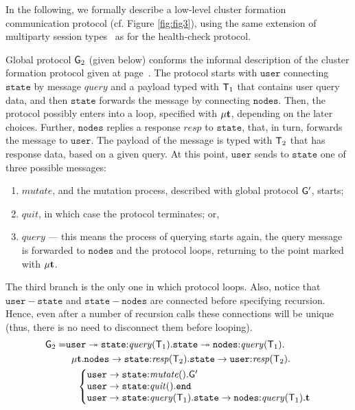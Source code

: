 In the following, we formally describe a low-level cluster formation communication protocol (cf. Figure \ref{fig:fig3}), using the same extension of multiparty session types~\cite{HuY17} as for the health-check protocol.

Global protocol ${\sf G}_2$ (given below) conforms the informal description of the cluster formation protocol given at page~\pageref{cluster_formation_informal_description}. 
The protocol starts with $\mathtt{user}$ connecting $\mathtt{state}$ by message $\mathit{query}$ and a payload typed with ${\mathsf T}_1$ that contains user query data, and  then $\mathtt{state}$ forwards the message by connecting $\mathtt{nodes}$. 
Then, the protocol possibly enters into a loop, specified with $\mu\textbf{t}$, depending on the later choices. 
Further, $\mathtt{nodes}$ replies a response $\mathit{resp}$ to $\mathtt{state}$, that, in turn, forwards the message to $\mathtt{user}$. The payload of the message is typed with ${\mathsf T}_2$ that has response data, based on a given query. 
At this point, $\mathtt{user}$  sends to $\mathtt{state}$ one of three possible messages:

\begin{enumerate}[start=1,label={(\bfseries \arabic*)}]
	\item $\mathit{mutate}$, and the mutation process, described with global protocol ${\sf G}'$, starts; 
	\item $\mathit{quit}$, in which case the protocol terminates; or,
	\item $\mathit{query}$ --- this means the process of querying starts again, the query message is forwarded to $\mathtt{nodes}$ and the protocol loops, returning to the point marked with $\mu\textbf{t}$.
\end{enumerate}
 
The third branch is the only one in which protocol loops. Also, notice that $\mathtt{user}-\mathtt{state}$ and $\mathtt{state}-\mathtt{nodes}$ are connected before specifying recursion. Hence, even after a number of recursion calls these connections will be unique (thus, there is no need to disconnect them before looping).   
\begin{align*}
\G_2 = & 
\mathtt{user} \twoheadrightarrow \mathtt{state}{:}\mathit{query}(\T_1).
\mathtt{state}\twoheadrightarrow \mathtt{nodes}{:}\mathit{query}(\T_1). \\
& \hspace{2mm}
\mu \ty.
\mathtt{nodes}\to \mathtt{state}{:}\mathit{resp}(\T_2).
\mathtt{state}\to\mathtt{user}{:}\mathit{resp}(\T_2). \\
& \hspace{4mm}
\left\{
\begin{array}{@{}l@{}}
\mathtt{user}\to\mathtt{state}{:} \mathit{mutate}().\G'\\
\mathtt{user}\to\mathtt{state}{:} \mathit{quit}().\tend\\
\mathtt{user}\to\mathtt{state}{:} \mathit{query}(\T_1).\mathtt{state}\to\mathtt{nodes}{:}\mathit{query}(\T_1).\ty
\end{array} \right.
\end{align*}


